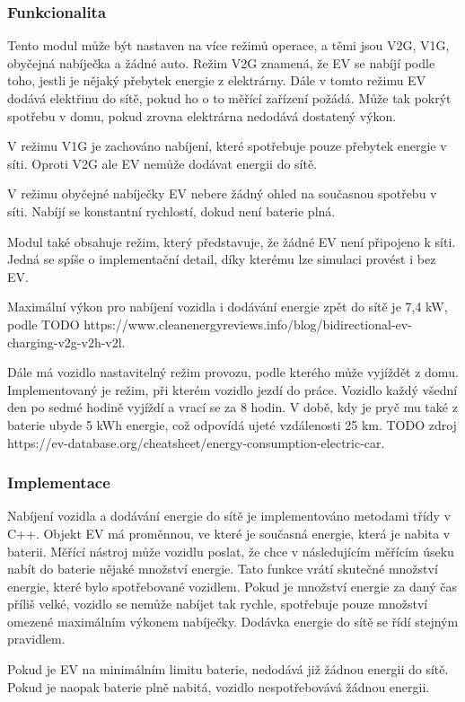 \documentclass[12pt,a4paper]{Cotmas-2018}
\begin{document}
\subsubsection{Funkcionalita}
Tento modul může být nastaven na více režimů operace, a těmi jsou V2G, V1G, obyčejná nabíječka a žádné auto.
Režim V2G znamená, že EV se nabíjí podle toho, jestli je nějaký přebytek energie z elektrárny.
Dále v tomto režimu EV dodává elektřinu do sítě, pokud ho o to měřící zařízení požádá.
Může tak pokrýt spotřebu v domu, pokud zrovna elektrárna nedodává dostatený výkon.

V režimu V1G je zachováno nabíjení, které spotřebuje pouze přebytek energie v síti.
Oproti V2G ale EV nemůže dodávat energii do sítě.

V režimu obyčejné nabíječky EV nebere žádný ohled na současnou spotřebu v síti.
Nabíjí se konstantní rychlostí, dokud není baterie plná.

Modul také obsahuje režim, který představuje, že žádné EV není připojeno k síti.
Jedná se spíše o implementační detail, díky kterému lze simulaci provést i bez EV.

Maximální výkon pro nabíjení vozidla i dodávání energie zpět do sítě je 7,4 kW, podle TODO https://www.cleanenergyreviews.info/blog/bidirectional-ev-charging-v2g-v2h-v2l.

Dále má vozidlo nastavitelný režim provozu, podle kterého může vyjíždět z domu.
Implementovaný je režim, při kterém vozidlo jezdí do práce.
Vozidlo každý všední den po sedmé hodině vyjíždí a vrací se za 8 hodin.
V době, kdy je pryč mu také z baterie ubyde 5 kWh energie,
což odpovídá ujeté vzdálenosti 25 km. TODO zdroj https://ev-database.org/cheatsheet/energy-consumption-electric-car.

\subsubsection{Implementace}
Nabíjení vozidla a dodávání energie do sítě je implementováno metodami třídy v C++.
Objekt EV má proměnnou, ve které je současná energie, která je nabita v baterii.
Měřící nástroj může vozidlu poslat, že chce v následujícím měřícím úseku nabít do baterie nějaké množství energie.
Tato funkce vrátí skutečné množství energie, které bylo spotřebované vozidlem.
Pokud je množství energie za daný čas příliš velké,
vozidlo se nemůže nabíjet tak rychle, spotřebuje pouze množství omezené maximálním výkonem nabíječky.
Dodávka energie do sítě se řídí stejným pravidlem.

Pokud je EV na minimálním limitu baterie, nedodává již žádnou energii do sítě.
Pokud je naopak baterie plně nabitá, vozidlo nespotřebovává žádnou energii.
\end{document}
